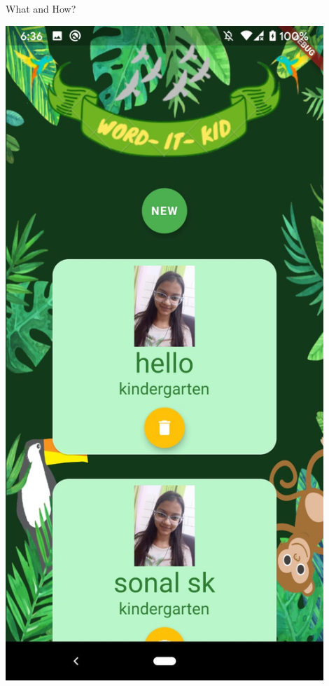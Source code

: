 \documentclass[14pt]{beamer}
\begin{document}
\begin{frame}{What and How?}
\begin{enumerate}
            \includegraphics[width=0.9\textwidth]{Issue3}
    \end{enumerate}
\end{frame}
\end{document}

